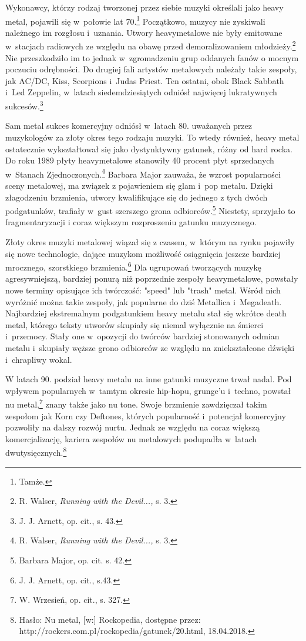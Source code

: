 \documentclass[12pt, a4paper, titlepage]{report}
\begin{document}
Wykonawcy, którzy rodzaj tworzonej przez siebie muzyki określali jako heavy metal, pojawili się w~połowie lat 70.\footnote{Tamże.} Początkowo, muzycy nie zyskiwali należnego im rozgłosu i~uznania. Utwory heavymetalowe nie były emitowane w~stacjach radiowych ze względu na obawę przed demoralizowaniem młodzieży.\footnote{R. Walser, \textit{Running with the Devil...,} s. 3. } Nie przeszkodziło im to jednak w~zgromadzeniu grup oddanych fanów o mocnym poczuciu odrębności. Do drugiej fali artystów metalowych należały takie zespoły, jak AC/DC, Kiss, Scorpions i~Judas Priest. Ten ostatni, obok Black Sabbath i~Led Zeppelin, w~latach siedemdziesiątych odniósł najwięcej lukratywnych sukcesów.\footnote{J. J. Arnett, op. cit., s. 43.}

Sam metal sukces komercyjny odniósł w~latach 80. uważanych przez muzykologów za złoty okres tego rodzaju muzyki. To wtedy również, heavy metal ostatecznie wykształtował się jako dystynktywny gatunek, różny od hard rocka. Do roku 1989 płyty heavymetalowe stanowiły 40 procent płyt sprzedanych w~Stanach Zjednoczonych.\footnote{R. Walser, \textit{Running with the Devil...,} s. 3.} Barbara Major zauważa, że wzrost popularności sceny metalowej, ma związek z pojawieniem się glam i~pop metalu. Dzięki złagodzeniu brzmienia, utwory kwalifikujące się do jednego z tych dwóch podgatunków, trafiały w~gust szerszego grona odbiorców.\footnote{Barbara Major, op. cit. s. 42.} Niestety, sprzyjało to fragmentaryzacji i coraz większym rozproszeniu gatunku muzycznego.

Złoty okres muzyki metalowej wiązał się z czasem, w~którym na rynku pojawiły się nowe technologie, dające muzykom możliwość osiągnięcia jeszcze bardziej mrocznego, szorstkiego brzmienia.\footnote{J. J. Arnett, op. cit., s.43.} Dla ugrupowań tworzących muzykę agresywniejszą, bardziej ponurą niż poprzednie zespoły heavymetalowe, powstały nowe terminy opisujące ich twórczość: "speed" lub "trash" metal. Wśród nich wyróżnić można takie zespoły, jak popularne do dziś Metallica i~Megadeath. Najbardziej ekstremalnym podgatunkiem heavy metalu stał się wkrótce death metal, którego teksty utworów skupiały się niemal wyłącznie na śmierci i~przemocy. Stały one w~opozycji do twórców bardziej stonowanych odmian metalu i~skupiały węższe grono odbiorców ze względu na zniekształcone dźwięki i~chrapliwy wokal.

W latach 90. podział heavy metalu na inne gatunki muzyczne trwał nadal. Pod wpływem popularnych w~tamtym okresie hip-hopu, grunge'u i~techno, powstał nu metal,\footnote{W. Wrzesień, op. cit., s. 327.} znany także jako nu tone. Swoje brzmienie zawdzięczał takim zespołom jak Korn czy Deftones, których popularność i~potencjał komercyjny pozwoliły na dalszy rozwój nurtu. Jednak ze względu na coraz większą komercjalizację, kariera zespołów nu metalowych podupadła w~latach dwutysięcznych.\footnote{Hasło: Nu metal, [w:] Rockopedia, dostępne przez: http://rockers.com.pl/rockopedia/gatunek/20.html, 18.04.2018.} 
\end{document}
